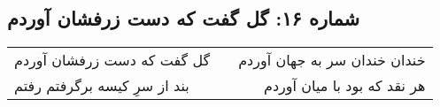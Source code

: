 \begin{center}
\section*{شماره ۱۶: گل گفت که دست زرفشان آوردم}
\label{sec:016}
\begin{longtable}{l p{0.5cm} r}
گل گفت که دست زرفشان آوردم
&&
خندان خندان سر به جهان آوردم
\\
بند از سرِ کیسه برگرفتم رفتم
&&
هر نقد که بود با میان آوردم
\\
\end{longtable}
\end{center}
